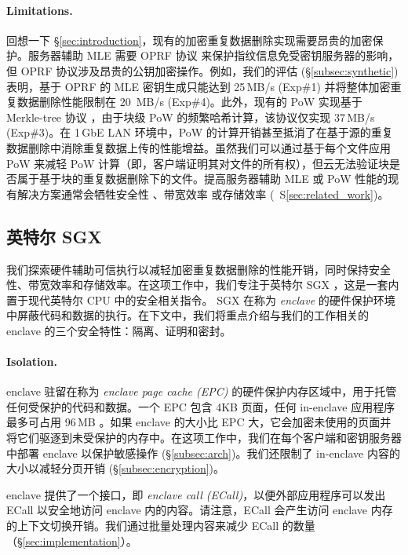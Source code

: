 \paragraph{Limitations.} 回想一下 \S\ref{sec:introduction}，现有的加密重复数据删除实现需要昂贵的加密保护。服务器辅助 MLE 需要 OPRF 协议 \cite{naor04} 来保护指纹信息免受密钥服务器的影响，但 OPRF 协议涉及昂贵的公钥加密操作。例如，我们的评估 (\S\ref{subsec:synthetic}) 表明，基于 OPRF 的 MLE 密钥生成只能达到 25\,MB/s (Exp\#1) 并将整体加密重复数据删除性能限制在 20 \,MB/s (Exp\#4)。此外，现有的 PoW 实现基于 Merkle-tree 协议 \cite{halevi11}，由于块级 PoW 的频繁哈希计算，该协议仅实现 37\,MB/s (Exp\#3)。在 1\,GbE LAN 环境中，PoW 的计算开销甚至抵消了在基于源的重复数据删除中消除重复数据上传的性能增益。虽然我们可以通过基于每个文件应用 PoW 来减轻 PoW 计算（即，客户端证明其对文件的所有权），但云无法验证块是否属于基于块的重复数据删除下的文件。提高服务器辅助 MLE 或 PoW 性能的现有解决方案通常会牺牲安全性 \cite{li20b,xu13,pietro12}、带宽效率 \cite{harnik10,li15} 或存储效率 \cite{zhou15,qin17,li20b} (\ S\ref{sec:related_work})。

\subsection{英特尔 SGX}
\label{subsec:sgx} 

我们探索硬件辅助可信执行以减轻加密重复数据删除的性能开销，同时保持安全性、带宽效率和存储效率。在这项工作中，我们专注于英特尔 SGX \cite{sgx}，这是一套内置于现代英特尔 CPU 中的安全相关指令。 SGX 在称为 {\em enclave} 的硬件保护环境中屏蔽代码和数据的执行。在下文中，我们将重点介绍与我们的工作相关的 enclave 的三个安全特性：隔离、证明和密封。

\paragraph{Isolation.} enclave 驻留在称为 {\em enclave page cache (EPC)} 的硬件保护内存区域中，用于托管任何受保护的代码和数据。一个 EPC 包含 4KB 页面，任何 in-enclave 应用程序最多可占用 96\,MB \cite{harnik18}。如果 enclave 的大小比 EPC 大，它会加密未使用的页面并将它们驱逐到未受保护的内存中。在这项工作中，我们在每个客户端和密钥服务器中部署 enclave 以保护敏感操作 (\S\ref{subsec:arch})。我们还限制了 in-enclave 内容的大小以减轻分页开销 (\S\ref{subsec:encryption})。

enclave 提供了一个接口，即 {\em enclave call (ECall)}，以便外部应用程序可以发出 ECall 以安全地访问 enclave 内的内容。请注意，ECall 会产生访问 enclave 内存 \cite{harnik18} 的上下文切换开销。我们通过批量处理内容来减少 ECall 的数量（\S\ref{sec:implementation}）。

